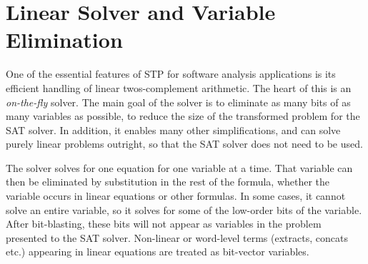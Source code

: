 \section{Linear Solver and Variable Elimination}



One of the essential features of STP for software analysis
applications is its efficient handling of linear twos-complement
arithmetic.  The heart of this is an {\em on-the-fly\/} solver.  The
main goal of the solver is to eliminate as many bits of as many
variables as possible, to reduce the size of the transformed problem
for the SAT solver.  In addition, it enables many other
simplifications, and can solve purely linear problems outright, so
that the SAT solver does not need to be used.

The solver solves for one equation for one variable at a time.  That
variable can then be eliminated by substitution in the rest of the
formula, whether the variable occurs in linear equations or other
formulas.  In some cases, it cannot solve an entire variable, so it
solves for some of the low-order bits of the variable.  After
bit-blasting, these bits will not appear as variables in the problem
presented to the SAT solver. Non-linear or word-level terms (extracts,
concats etc.) appearing in linear equations are treated as bit-vector
variables.

